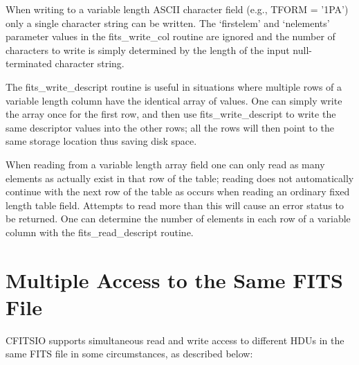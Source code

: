 \documentclass[11pt]{book}
\begin{document}
When writing to a variable length ASCII character field (e.g., TFORM =
'1PA') only a single character string can be written.  The `firstelem'
and `nelements' parameter values in the fits\_write\_col routine are
ignored and the number of characters to write is simply determined by
the length of the input null-terminated character string.

The fits\_write\_descript routine is useful in situations where
multiple rows of a variable length column have the identical array of
values.  One can simply write the array once for the first row, and
then use fits\_write\_descript to write the same descriptor values into
the other rows;  all the rows will then point to the same storage
location thus saving disk space.

When reading from a variable length array field one can only read as
many elements as actually exist in that row of the table; reading does
not automatically continue with the next row of the table as occurs
when reading an ordinary fixed length table field.  Attempts to read
more than this will cause an error status to be returned.  One can
determine the number of elements in each row of a variable column with
the fits\_read\_descript routine.


\section{Multiple Access to the Same FITS File}

CFITSIO supports simultaneous read and write access to different
HDUs in the same FITS file in some circumstances, as described
below:
\end{document}

